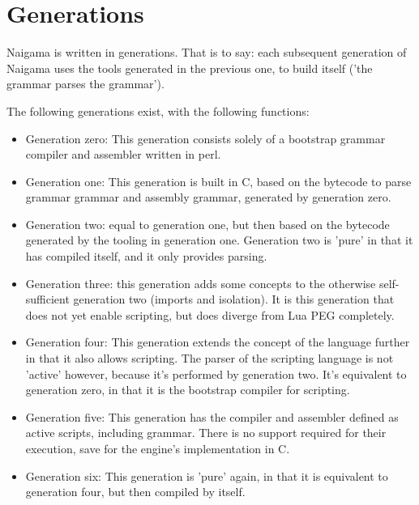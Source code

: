 \section{Generations}

Naigama is written in generations. That is to say:
each subsequent generation of Naigama uses the tools generated
in the previous one, to build itself ('the grammar parses the grammar').

The following generations exist, with the following functions:

\begin{itemize}

\item Generation zero: This generation consists solely of a bootstrap
      grammar compiler and assembler written in perl.

\item Generation one: This generation is
      built in C, based on the bytecode to parse grammar grammar
      and assembly grammar, generated by generation zero.

\item Generation two: equal to generation one, but then based on
      the bytecode generated by the tooling in generation one.
      Generation two is 'pure' in that it has compiled itself,
      and it only provides parsing.

\item Generation three: this generation adds some concepts to the
      otherwise self-sufficient generation two (imports and
      isolation). It is this generation that does not yet enable
      scripting, but does diverge from Lua PEG completely.

\item Generation four: This generation extends the concept of the
      language further in that it also allows scripting.
      The parser of the scripting language is not 'active' however,
      because it's performed by generation two.
      It's equivalent to generation zero, in that it is the bootstrap
      compiler for scripting.

\item Generation five: This generation has the compiler and assembler
      defined as active scripts, including grammar. There is no
      support required for their execution, save for the engine's
      implementation in C.

\item Generation six: This generation is 'pure' again, in that it
      is equivalent to generation four, but then compiled by itself.

\end{itemize}
